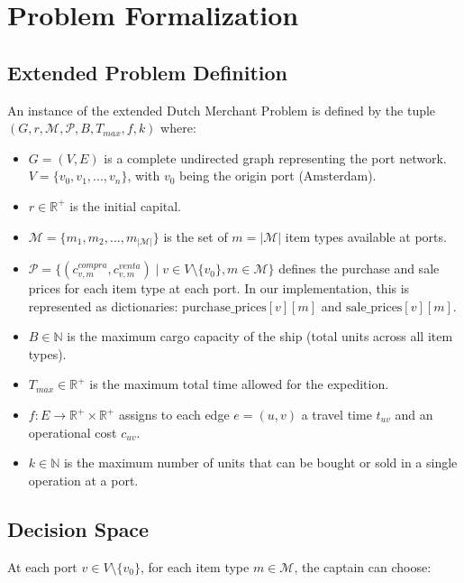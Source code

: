 \documentclass[12pt]{article}
\begin{document}
\section{Problem Formalization}
\label{sec:formalization}

\subsection{Extended Problem Definition}

An instance of the extended Dutch Merchant Problem is defined by the tuple $(G, r, \mathcal{M}, \mathcal{P}, B, T_{max}, f, k)$ where:

\begin{itemize}
    \item $G=(V, E)$ is a complete undirected graph representing the port network. $V = \{v_0, v_1, ..., v_n\}$, with $v_0$ being the origin port (Amsterdam).
    \item $r \in \mathbb{R}^+$ is the initial capital.
    \item $\mathcal{M} = \{m_1, m_2, ..., m_{|\mathcal{M}|}\}$ is the set of $m = |\mathcal{M}|$ item types available at ports.
    \item $\mathcal{P} = \{(c_{v,m}^{compra}, c_{v,m}^{venta}) \mid v \in V \setminus \{v_0\}, m \in \mathcal{M}\}$ defines the purchase and sale prices for each item type at each port. In our implementation, this is represented as dictionaries: $\text{purchase\_prices}[v][m]$ and $\text{sale\_prices}[v][m]$.
    \item $B \in \mathbb{N}$ is the maximum cargo capacity of the ship (total units across all item types).
    \item $T_{max} \in \mathbb{R}^+$ is the maximum total time allowed for the expedition.
    \item $f: E \rightarrow \mathbb{R}^+ \times \mathbb{R}^+$ assigns to each edge $e=(u,v)$ a travel time $t_{uv}$ and an operational cost $c_{uv}$.
    \item $k \in \mathbb{N}$ is the maximum number of units that can be bought or sold in a single operation at a port.
\end{itemize}

\subsection{Decision Space}

At each port $v \in V \setminus \{v_0\}$, for each item type $m \in \mathcal{M}$, the captain can choose:
\end{document}
